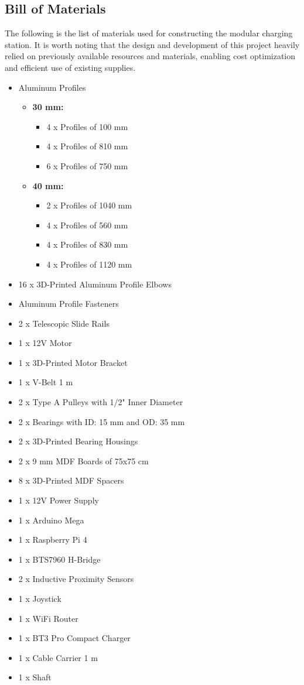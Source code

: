 \subsection{Bill of Materials}
The following is the list of materials used for constructing the modular charging station. It is worth noting that the design and development of this project heavily relied on previously available resources and materials, enabling cost optimization and efficient use of existing supplies.
\begin{itemize}
    \item Aluminum Profiles
        \begin{itemize}
            \item \textbf{30 mm:}
            \begin{itemize}
            \item 4 x Profiles of 100 mm
            \item 4 x Profiles of 810 mm
            \item 6 x Profiles of 750 mm
            \end{itemize}
            \item \textbf{40 mm:}
            \begin{itemize}
            \item 2 x Profiles of 1040 mm
            \item 4 x Profiles of 560 mm
            \item 4 x Profiles of 830 mm
            \item 4 x Profiles of 1120 mm
            \end{itemize}
        \end{itemize}
    \item 16 x 3D-Printed Aluminum Profile Elbows
    \item Aluminum Profile Fasteners
    \item 2 x Telescopic Slide Rails
    \item 1 x 12V Motor
    \item 1 x 3D-Printed Motor Bracket
    \item 1 x V-Belt 1 m
    \item 2 x Type A Pulleys with 1/2" Inner Diameter
    \item 2 x Bearings with ID: 15 mm and OD: 35 mm
    \item 2 x 3D-Printed Bearing Housings
    \item 2 x 9 mm MDF Boards of 75x75 cm
    \item 8 x 3D-Printed MDF Spacers
    \item 1 x 12V Power Supply
    \item 1 x Arduino Mega
    \item 1 x Raspberry Pi 4
    \item 1 x BTS7960 H-Bridge
    \item 2 x Inductive Proximity Sensors
    \item 1 x Joystick
    \item 1 x WiFi Router
    \item 1 x BT3 Pro Compact Charger
    \item 1 x Cable Carrier 1 m
    \item 1 x Shaft
\end{itemize}

